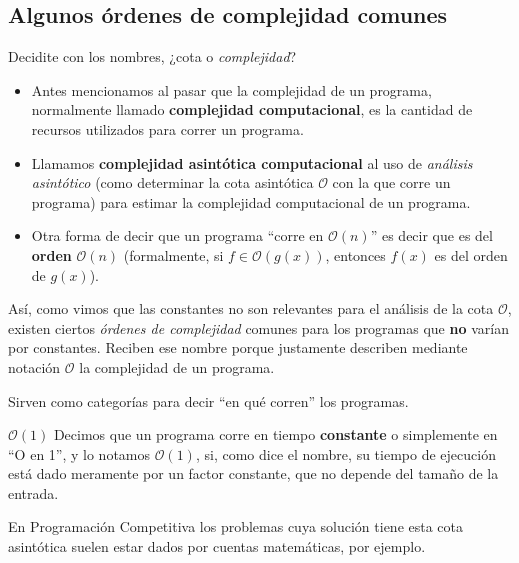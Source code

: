 \documentclass{beamer}
\begin{document}
    \subsection{Algunos órdenes de complejidad comunes}
    \begin{frame}
    \end{frame}
    
    \begin{frame}{Decidite con los nombres, ¿cota o \textit{complejidad}?}
        \begin{itemize}
            \item Antes mencionamos al pasar que la complejidad de un programa, normalmente llamado \textbf{complejidad computacional}, es la cantidad de recursos utilizados para correr un programa. \pause

            \item Llamamos \textbf{complejidad asintótica computacional} al uso de \textit{análisis asintótico} (como determinar la cota asintótica $\mathcal{O}$ con la que corre un programa) para estimar la complejidad computacional de un programa. \pause

            \item Otra forma de decir que un programa ``corre en $\mathcal{O}(n)$'' es decir que es del \textbf{orden} $\mathcal{O}(n)$ (formalmente, si $f \in \mathcal{O}(g(x))$, entonces $f(x)$ es del orden de $g(x)$). \pause
        \end{itemize}

        Así, como vimos que las constantes no son relevantes para el análisis de la cota $\mathcal{O}$, existen ciertos \textit{órdenes de complejidad} comunes para los programas que \textbf{no} varían por constantes. \pause Reciben ese nombre porque justamente describen mediante notación $\mathcal{O}$ la complejidad de un programa.  \pause

        Sirven como categorías para decir ``en qué corren'' los programas.
    \end{frame}
    
    \begin{frame}{$\mathcal{O}(1)$}
        Decimos que un programa corre en tiempo \textbf{constante} o simplemente en ``O en 1'', y lo notamos $\mathcal{O}(1)$, si, como dice el nombre, su tiempo de ejecución está dado meramente por un factor constante, que no depende del tamaño de la entrada. \pause \vspace{8pt}

        En Programación Competitiva los problemas cuya solución tiene esta cota asintótica suelen estar dados por cuentas matemáticas, por ejemplo.
    \end{frame}
\end{document}
